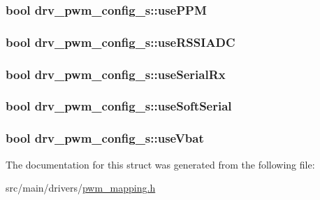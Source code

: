 \hypertarget{structdrv__pwm__config__s_a2ee7f3ae5a9c3dcea7fe93ec93d63bde}{
\subsubsection[{use\+P\+P\+M}]{\setlength{\rightskip}{0pt plus 5cm}bool drv\+\_\+pwm\+\_\+config\+\_\+s\+::use\+P\+P\+M}}\label{structdrv__pwm__config__s_a2ee7f3ae5a9c3dcea7fe93ec93d63bde}
\hypertarget{structdrv__pwm__config__s_a80a55298b045db8a058fdc8ef3c28ff9}{
\subsubsection[{use\+R\+S\+S\+I\+A\+D\+C}]{\setlength{\rightskip}{0pt plus 5cm}bool drv\+\_\+pwm\+\_\+config\+\_\+s\+::use\+R\+S\+S\+I\+A\+D\+C}}\label{structdrv__pwm__config__s_a80a55298b045db8a058fdc8ef3c28ff9}
\hypertarget{structdrv__pwm__config__s_ae275b5bace3869325aea119a0bb7c0f5}{
\subsubsection[{use\+Serial\+Rx}]{\setlength{\rightskip}{0pt plus 5cm}bool drv\+\_\+pwm\+\_\+config\+\_\+s\+::use\+Serial\+Rx}}\label{structdrv__pwm__config__s_ae275b5bace3869325aea119a0bb7c0f5}
\hypertarget{structdrv__pwm__config__s_ab6d60e3e33b7a9a5d2f3a33c6a7d7247}{
\subsubsection[{use\+Soft\+Serial}]{\setlength{\rightskip}{0pt plus 5cm}bool drv\+\_\+pwm\+\_\+config\+\_\+s\+::use\+Soft\+Serial}}\label{structdrv__pwm__config__s_ab6d60e3e33b7a9a5d2f3a33c6a7d7247}
\hypertarget{structdrv__pwm__config__s_afefe64ea72b6455e705845dd10026b63}{
\subsubsection[{use\+Vbat}]{\setlength{\rightskip}{0pt plus 5cm}bool drv\+\_\+pwm\+\_\+config\+\_\+s\+::use\+Vbat}}\label{structdrv__pwm__config__s_afefe64ea72b6455e705845dd10026b63}


The documentation for this struct was generated from the following file\+:\begin{DoxyCompactItemize}
\item 
src/main/drivers/\hyperlink{pwm__mapping_8h}{pwm\+\_\+mapping.\+h}\end{DoxyCompactItemize}
